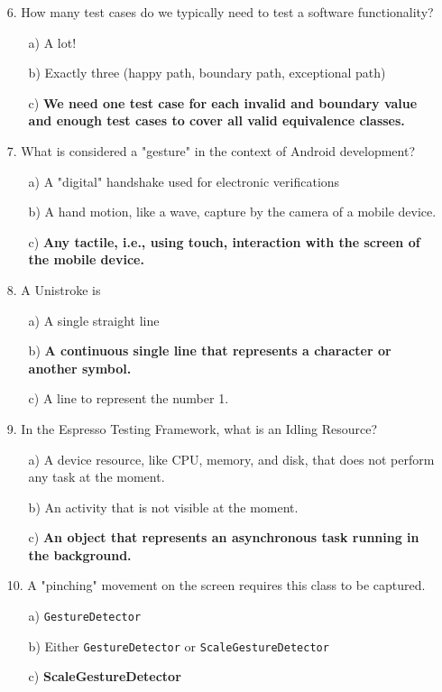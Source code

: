 \documentclass[12pt]{book}
\begin{document}
\begin{itemize}
    \item[6.] How many test cases do we typically need to test a software functionality?
    \begin{itemize}
        \item[a)] A lot!
        \item[b)] Exactly three (happy path, boundary path, exceptional path)
        \item[c)] \textbf{We need one test case for each invalid and boundary value and enough test cases to cover all valid equivalence classes.}
    \end{itemize}

    \item[7.] What is considered a "gesture" in the context of Android development?
    \begin{itemize}
        \item[a)] A "digital" handshake used for electronic verifications
        \item[b)] A hand motion, like a wave, capture by the camera of a mobile device.
        \item[c)] \textbf{Any tactile, i.e., using touch, interaction with the screen of the mobile device.}
    \end{itemize}

    \item[8.] A Unistroke is
    \begin{itemize}
        \item[a)] A single straight line
        \item[b)] \textbf{A continuous single line that represents a character or another symbol.}
        \item[c)] A line to represent the number 1.
    \end{itemize}

    \item[9.] In the Espresso Testing Framework, what is an Idling Resource?
    \begin{itemize}
        \item[a)] A device resource, like CPU, memory, and disk, that does not perform any task at the moment.
        \item[b)] An activity that is not visible at the moment.
        \item[c)] \textbf{An object that represents an asynchronous task running in the background.}
    \end{itemize}

    \item[10.] A "pinching" movement on the screen requires this class to be captured.
    \begin{itemize}
        \item[a)] \texttt{GestureDetector}
        \item[b)] Either \texttt{GestureDetector} or \texttt{ScaleGestureDetector}
        \item[c)] \textbf{ScaleGestureDetector}
    \end{itemize}

\end{itemize}
\newpage
\end{document}
